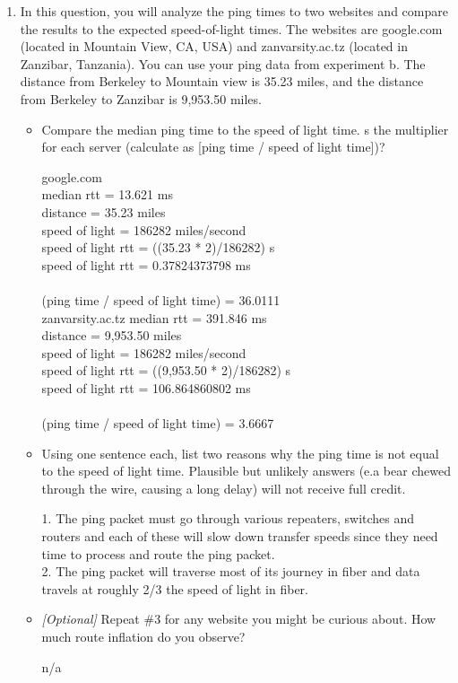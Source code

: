 \documentclass[10pt]{article}
\begin{document}
\begin{enumerate}
\item In this question, you will analyze the ping times to two websites and compare the results to the expected speed-of-light times. The websites are google.com (located in Mountain View, CA, USA) and zanvarsity.ac.tz (located in Zanzibar, Tanzania). You can use your ping data from experiment b. The distance from Berkeley to Mountain view is 35.23 miles, and the distance from Berkeley to Zanzibar is 9,953.50 miles.

\begin{itemize}

\item Compare the median ping time to the speed of light time. s the multiplier for each server (calculate as [ping time / speed of light time])?

google.com \\
median rtt = 13.621 ms \\
distance = 35.23 miles \\
speed of light = 186282 miles/second \\
speed of light rtt = ((35.23 * 2)/186282) s \\
speed of light rtt = 0.37824373798 ms \\
\\
(ping time / speed of light time) = 36.0111 \\

zanvarsity.ac.tz
median rtt = 391.846 ms \\
distance = 9,953.50 miles \\
speed of light = 186282 miles/second \\
speed of light rtt = ((9,953.50 * 2)/186282) s \\
speed of light rtt = 106.864860802 ms \\
\\
(ping time / speed of light time) = 3.6667

\item Using one sentence each, list two reasons why the ping time is not equal to the speed of light time. Plausible but unlikely answers (e.a bear chewed through the wire, causing a long delay) will not receive full credit.

1. The ping packet must go through various repeaters, switches and routers and each of these will slow down transfer speeds since they need time to process and route the ping packet.
\\
2. The ping packet will traverse most of its journey in fiber and data travels at roughly 2/3 the speed of light in fiber.


\item \emph{[Optional]} Repeat \#3 for any website you might be curious about. How much route inflation do you observe?

n/a

\end{itemize}
\end{enumerate}
\end{document}
